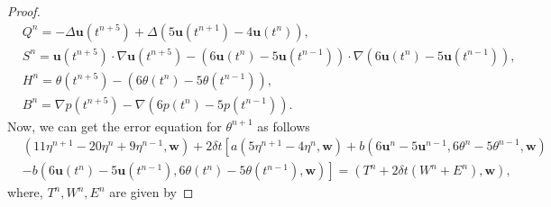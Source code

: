 \documentclass[10pt]{article}
\begin{document}
\begin{proof}
\begin{align}
			&Q^n=-\Delta\bm{u}(t^{n+5})+\Delta(5\bm{u}(t^{n+1})-4\bm{u}(t^{n})),\\
			&{ S^n=\bm{u}(t^{n+5})\cdot\nabla\bm{u}(t^{n+5})-(6\bm{u}(t^{n})-5\bm{u}(t^{n-1}))\cdot\nabla(6\bm{u}(t^{n})-5\bm{u}(t^{n-1}))},\label{4.5}\\
			&H^n=\theta(t^{n+5})-(6\theta(t^{n})-5\theta(t^{n-1})),\\
			&B^n=\nabla p(t^{n+5})-\nabla(6p(t^{n})-5p(t^{n-1})).
		\end{align}
		Now, we can get the error equation for $\theta^{n+1}$ as follows 
		\begin{align}
			&\left(11\eta^{n+1} - 20\eta^{n} + 9\eta^{n-1}, \bm{w}\right) 
			+ 2\delta t \left[ a\left(5\eta^{n+1} - 4\eta^{n}, \bm{w}\right) \right. + b\left(6\bm{u}^n - 5\bm{u}^{n-1}, 6\theta^{n} - 5\theta^{n-1}, \bm{w}\right)\nonumber\\
			&  \left. - b\left(6\bm{u}(t^n) - 5\bm{u}(t^{n-1}), {  6\theta(t^{n}) - 5\theta(t^{n-1})}, \bm{w}\right) \right] = (T^n + 2\delta t \left(W^n + E^n\right),\bm{w}), \label{4.8}
		\end{align}
		where, $T^n,W^n,E^n$ are given by
		

\end{proof}
\end{document}
